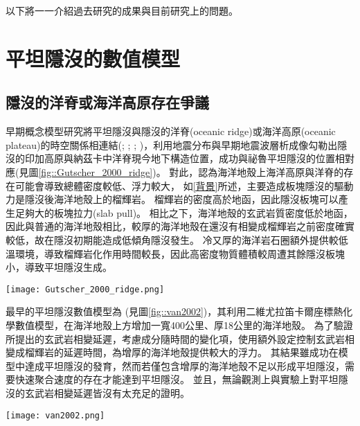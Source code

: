 以下將一一介紹過去研究的成果與目前研究上的問題。

\section{平坦隱沒的數值模型}\label{平坦隱沒的數值模型}
\subsection{隱沒的洋脊或海洋高原存在爭議}\label{隱沒的洋脊或海洋高原存在爭議}
早期概念模型研究將平坦隱沒與隱沒的洋脊(oceanic ridge)或海洋高原(oceanic plateau)的時空關係相連結(\citealp{pilger1981plate}; \citealp{henderson1984mesozoic}; \citealp{Gutscher2000A}; \citealp{gutscher2002andean})，\citealp{Gutscher2000A}利用地震分布與早期地震波層析成像勾勒出隱沒的印加高原與納茲卡中洋脊現今地下構造位置，成功與祕魯平坦隱沒的位置相對應(見圖\ref{fig::Gutscher_2000_ridge})。
對此，\citealp{Gutscher2000A}認為海洋地殼上海洋高原與洋脊的存在可能會導致總體密度較低、浮力較大，
如\ref{背景}所述，主要造成板塊隱沒的驅動力是隱沒後海洋地殼上的榴輝岩。
榴輝岩的密度高於地函，因此隱沒板塊可以產生足夠大的板塊拉力(slab pull)。
相比之下，海洋地殼的玄武岩質密度低於地函，因此與普通的海洋地殼相比，較厚的海洋地殼在還沒有相變成榴輝岩之前密度確實較低，故在隱沒初期能造成低傾角隱沒發生。
冷又厚的海洋岩石圈額外提供較低溫環境，導致榴輝岩化作用時間較長，因此高密度物質體積較周遭其餘隱沒板塊小，導致平坦隱沒生成。

\begin{figure*}[htp]
    \centering
    \texttt{[image: Gutscher\_2000\_ridge.png]}
    \caption[南美洲板塊構造圖]{南美洲板塊構造圖，摘自\citealp{Gutscher2000A}。粗黑線標出平坦隱沒段，灰色陰影區標示隱沒的海洋高原與洋脊，三角形為活動火山。板塊聚合速率由白色箭頭標出，數值參考自\citealp{demets1990current}。
    }
    \label{fig::Gutscher_2000_ridge}
\end{figure*}

最早的平坦隱沒數值模型為\citealp{van2002role} (見圖\ref{fig::van2002})，其利用二維尤拉笛卡爾座標熱化學數值模型，在海洋地殼上方增加一寬400公里、厚18公里的海洋地殼。
為了驗證\citealp{Gutscher2000A}所提出的玄武岩相變延遲，\citealp{van2002role}考慮成分隨時間的變化項，使用額外設定控制玄武岩相變成榴輝岩的延遲時間，為增厚的海洋地殼提供較大的浮力。
其結果雖成功在模型中達成平坦隱沒的發育，然而若僅包含增厚的海洋地殼不足以形成平坦隱沒，需要快速聚合速度的存在才能達到平坦隱沒。
並且，無論觀測上與實驗上對平坦隱沒的玄武岩相變延遲皆沒有太充足的證明。

\begin{figure*}[ht!]
    \centering
    \texttt{[image: van2002.png]}
    \caption[正常的隱沒帶與包含海洋高原的隱沒帶隨模型時間變化]{正常的隱沒帶(左)與包含海洋高原的隱沒帶(右)隨模型時間變化，摘自\citealp{van2002role}。黑白區域繪出海洋地殼的化學成分從玄武岩(黑)到榴輝岩(白)的變化。水平軸為與海溝的距離，背景顏色為溫度。
    }
    \label{fig::van2002}
\end{figure*}

